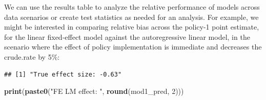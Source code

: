 \documentclass[
]{article}
\newenvironment{Shaded}{\begin{snugshade}}{\end{snugshade}}
\newcommand{\CommentTok}[1]{\textcolor[rgb]{0.56,0.35,0.01}{\textit{#1}}}
\newcommand{\DecValTok}[1]{\textcolor[rgb]{0.00,0.00,0.81}{#1}}
\newcommand{\KeywordTok}[1]{\textcolor[rgb]{0.13,0.29,0.53}{\textbf{#1}}}
\newcommand{\NormalTok}[1]{#1}
\newcommand{\OperatorTok}[1]{\textcolor[rgb]{0.81,0.36,0.00}{\textbf{#1}}}
\newcommand{\StringTok}[1]{\textcolor[rgb]{0.31,0.60,0.02}{#1}}
\begin{document}
We can use the results table to analyze the relative performance of
models across data scenarios or create test statistics as needed for an
analysis. For example, we might be interested in comparing relative bias
across the policy-1 point estimate, for the linear fixed-effect model
against the autoregressive linear model, in the scenario where the
effect of policy implementation is immediate and decreases the
crude.rate by 5\%:

\begin{Shaded}
\end{Shaded}

\begin{verbatim}
## [1] "True effect size: -0.63"
\end{verbatim}

\begin{Shaded}
\begin{Highlighting}[]
\KeywordTok{print}\NormalTok{(}\KeywordTok{paste0}\NormalTok{(}\StringTok{"FE LM effect: "}\NormalTok{, }\KeywordTok{round}\NormalTok{(mod1\_pred, }\DecValTok{2}\NormalTok{)))}
\end{Highlighting}
\end{Shaded}
\end{document}
